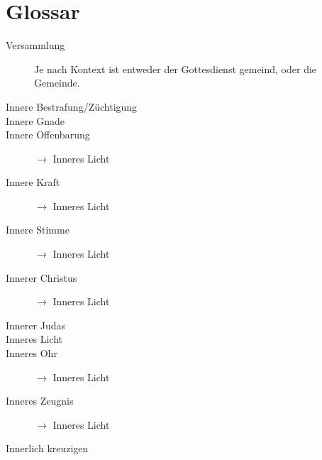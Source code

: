 \chapter{Glossar}
\begin{description}
 \item[Versammlung] Je nach Kontext ist entweder der Gottesdienst gemeind, oder die Gemeinde.
 \item[Innere Bestrafung/Züchtigung]
 \item[Innere Gnade]
 \item[Innere Offenbarung] $\to$ Inneres Licht
 \item[Innere Kraft] $\to$ Inneres Licht
 \item[Innere Stimme] $\to$ Inneres Licht
 \item[Innerer Christus] $\to$ Inneres Licht
 \item[Innerer Judas]
 \item[Inneres Licht]
 \item[Inneres Ohr] $\to$ Inneres Licht
 \item[Inneres Zeugnis] $\to$ Inneres Licht
 \item[Innerlich kreuzigen]
 \item[]
 \item[]
 \item[]
 \item[]
 \item[]
 \end{description}